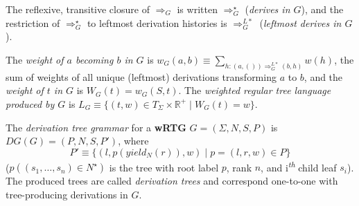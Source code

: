 \documentclass[english]{article}
\newcommand{\mts}{MT_\Sigma}
\newcommand\ternary[3]{
  \left\{ \begin{array}{ll}
      {#2}
      & \textit{if }{#1}\\
      {#3}
      & \textit{otherwise}
    \end{array} \right.
}
\newcommand\geneq{{\approx}}
\newcommand\comment[1]{}
\newcommand\logand{\wedge}
\newcommand\logor{\vee}
\newcommand\union{\cup}
\newcommand\positivereals{\mathbb{R}^{+}}
\newcommand\multiset[1]{\coll{M}(#1)}
\newcommand\seqn[2]{({#1}_{1},\ldots,{#1}_{#2})}
\newcommand\derives{\Rightarrow}
\newcommand\st{\;|\;}
\newcommand{\nth}[2]{#1\textsuperscript{\textit{#2}}}
\newcommand{\kstar}{^{\star}}
\newcommand\cls[1]{\textbf{#1}}
\newcommand\derivess[1]{\derives_{#1}}
\newcommand\derivesc[1]{\derives_{#1}\kstar}
\newcommand\derivesl[1]{\derives_{#1}^{L*}}
\begin{document}
  The reflexive, transitive closure of
  $\derivess{G}$ is written $\derivesc{G}$ (\emph{derives in $G$}), and
  the restriction of $\derivesc{G}$ to leftmost derivation histories is
  $\derivesl{G}$ (\emph{leftmost derives in $G$}).

  The \emph{weight of $a$ becoming $b$ in $G$} is $w_{G}(a,b) \equiv
  \sum_{h:(a,())\derivesl{G}(b,h)}w(h)$, the sum of weights of all unique
  (leftmost) derivations transforming $a$ to $b$, and the \emph{weight of $t$ in $G$} is
  $W_{G}(t)=w_{G}(S ,t)$.  The \emph{weighted regular tree language produced by
    $G$} is $L_{G}\equiv \{(t,w)\in T_{\Sigma} \times \positivereals \st
  W_{G}(t)=w \}$.

  The \emph{derivation tree grammar} for a \cls{wRTG} $G=(\Sigma,N,S,P)$ is $DG(G)=(P,N,S,P')$, where
  \[
  P'\equiv\{(l,p(yield_{N}(r)),w)\st p=(l,r,w)\in{P}\}
  \]
  ($p((s_{1},\ldots,s_{n})\in N\kstar)$ is the tree with root label $p$, rank $n$, and \nth{i}{th} child leaf $s_{i}$).  The produced trees are called \emph{derivation trees} and correspond one-to-one with tree-producing derivations in $G$.



\comment{
  \subsection{Unordered Trees}

  Just like a multiset is a sequence where we don't care about the order of its
  elements, we can consider trees where we don't care about the order of
  children. Call $\mts=\{t=(root(t)\in \Sigma,children_t\in \multiset{\mts})\}$ the set of \emph{(rooted, labeled, finite) unordered trees
    over alphabet $\Sigma$}.

  The root's label is \emph{$root(t)$}; its rank would be
  $|children_t|$).  Paths are not defined for unordered trees, but, as
  with ordered trees, we are interested in the subtrees descended along paths
  labeled by a monadic string, $t\downarrow s$:
  \[
  t\downarrow^\geneq \seqn{s}{n}\equiv \ternary{n>1}{
    \union_{(c,m)\in{t\downarrow (s_1)}}m(c\downarrow (s_2,\ldots,s_n))
  }{\ternary{root(t)\geneq s_1}{\{t\}}{\emptyset}}
  \]
  As for ordered trees, we let $mstrings_t$ be a multiset (instead of a sequence) with
  multiplicity for $s$ $mstrings_t(s)\equiv |t\downarrow s|$.
\comment{
Similarly, we define $children_{t}^{\geneq}(l)\equiv t\downarrow^{\geneq} (l)$.
}

  An ordered tree $t$ can be interpreted as an unordered tree $u$ by the recursive
  rule $U$ that $U(t)\equiv (root(u)\equiv root(t), children_u\equiv U(children_t)$
  (sequence interpreted as a multiset).  Then, properties related to monadic
  strings $s$ of $t$ should be the same multiset in the ordered $t$ as in
  $u$---for example, $t \downarrow s=u \downarrow s$.
}
\end{document}
